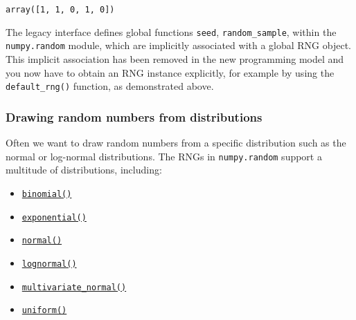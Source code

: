\documentclass{scrartcl}
\makeatletter
\providecommand{\tightlist}{%
      \setlength{\itemsep}{0pt}\setlength{\parskip}{0pt}}
\newcommand{\boxspacing}{\kern\kvtcb@left@rule\kern\kvtcb@boxsep}
\newcommand{\prompt}[4]{
        {\ttfamily\llap{{\color{#2}[#3]:\hspace{3pt}#4}}\vspace{-\baselineskip}}
    }
\makeatother
\begin{document}
            \begin{tcolorbox}[breakable, size=fbox, boxrule=.5pt, pad at break*=1mm, opacityfill=0]
\prompt{Out}{outcolor}{11}{\boxspacing}
\begin{Verbatim}[commandchars=\\\{\}]
array([1, 1, 0, 1, 0])
\end{Verbatim}
\end{tcolorbox}
        
    The legacy interface defines global functions \texttt{seed},
\texttt{random\_sample}, \etc within the \texttt{numpy.random} module,
which are implicitly associated with a global RNG object. This implicit
association has been removed in the new programming model and you now
have to obtain an RNG instance explicitly, for example by using the
\texttt{default\_rng()} function, as demonstrated above.

    \hypertarget{drawing-random-numbers-from-distributions}{%
\subsubsection{Drawing random numbers from
distributions}\label{drawing-random-numbers-from-distributions}}

Often we want to draw random numbers from a specific distribution such
as the normal or log-normal distributions. The RNGs in
\texttt{numpy.random} support a multitude of distributions, including:

\begin{itemize}
\tightlist
\item
  \href{https://numpy.org/doc/stable/reference/random/generated/numpy.random.RandomState.binomial.html}{\texttt{binomial()}}
\item
  \href{https://numpy.org/doc/stable/reference/random/generated/numpy.random.RandomState.exponential.html}{\texttt{exponential()}}
\item
  \href{https://numpy.org/doc/stable/reference/random/generated/numpy.random.RandomState.normal.html}{\texttt{normal()}}
\item
  \href{https://numpy.org/doc/stable/reference/random/generated/numpy.random.RandomState.lognormal.html}{\texttt{lognormal()}}
\item
  \href{https://numpy.org/doc/stable/reference/random/generated/numpy.random.RandomState.multivariate_normal.html}{\texttt{multivariate\_normal()}}
\item
  \href{https://numpy.org/doc/stable/reference/random/generated/numpy.random.RandomState.uniform.html}{\texttt{uniform()}}
\end{itemize}
\end{document}
